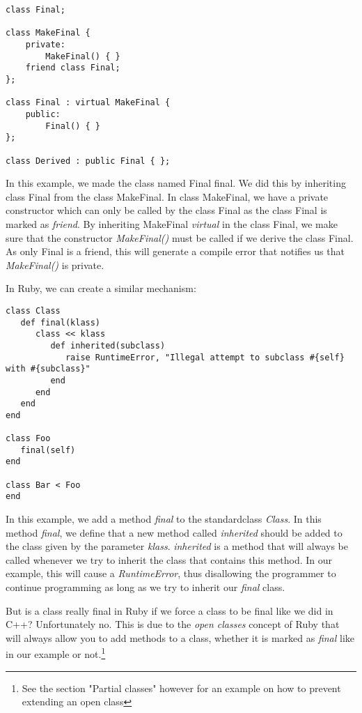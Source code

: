 \documentclass[10pt,a4paper,twocolumn]{article}
\begin{document}
\begin{lstlisting}
class Final;
 
class MakeFinal {
	private:
    	MakeFinal() { }
    friend class Final;
};
 
class Final : virtual MakeFinal {
	public:
		Final() { }
};

class Derived : public Final { };
\end{lstlisting}

In this example, we made the class named Final final. We did this by inheriting class Final from the class MakeFinal. In class MakeFinal, we have a private constructor which can only be called by the class Final as the class Final is marked as \textit{friend}. By inheriting MakeFinal \textit{virtual} in the class Final, we make sure that the constructor \textit{MakeFinal()} must be called if we derive the class Final. As only Final is a friend, this will generate a compile error that notifies us that \textit{MakeFinal()} is private.

In Ruby, we can create a similar mechanism:

\begin{lstlisting}
class Class
   def final(klass)
      class << klass
         def inherited(subclass)
            raise RuntimeError, "Illegal attempt to subclass #{self} with #{subclass}"
         end
      end
   end
end

class Foo
   final(self)
end

class Bar < Foo
end
\end{lstlisting}

In this example, we add a method \textit{final} to the standardclass \textit{Class}. In this method \textit{final}, we define that a new method called \textit{inherited} should be added to the class given by the parameter \textit{klass}. \textit{inherited} is a method that will always be called whenever we try to inherit the class that contains this method. In our example, this will cause a \textit{RuntimeError}, thus disallowing the programmer to continue programming as long as we try to inherit our \textit{final} class.

But is a class really final in Ruby if we force a class to be final like we did in C++? Unfortunately no. This is due to the \textit{open classes} concept of Ruby that will always allow you to add methods to a class, whether it is marked as \textit{final} like in our example or not.\footnote{See the section "Partial classes" however for an example on how to prevent extending an open class}
\end{document}
